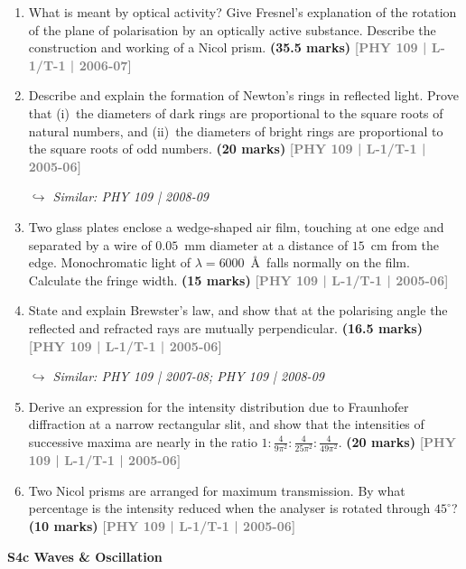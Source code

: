 \documentclass[12pt,a3paper]{article}
\newcommand{\yr}[1]{\hfill\textcolor{gray}{\small\textbf{[#1]}}}
\newcommand{\mk}[1]{\textcolor{orange!70!black}{\small\textbf{(#1 marks)}}}
\newcommand{\variant}[1]{\par\vspace{1pt}\textcolor{blue!50!black}%
  {\footnotesize\textit{$\hookrightarrow$ Similar: #1}}}
\newcommand{\subtopic}[2]{%
  \vspace{10pt}
  \noindent\begin{tcolorbox}[colback=#1!8,colframe=#1,boxrule=0.6pt,arc=4pt,
    left=6pt,right=6pt,top=4pt,bottom=4pt]
    \small\bfseries\textcolor{#1}{#2}
  \end{tcolorbox}
  \vspace{2pt}
}
\begin{document}
\begin{enumerate}
\item What is meant by optical activity? Give Fresnel's explanation of the rotation of the plane of polarisation by an optically active substance. Describe the construction and working of a Nicol prism.
\mk{35.5} \yr{PHY 109 | L-1/T-1 | 2006-07}

\item Describe and explain the formation of Newton's rings in reflected light. Prove that (i)~the diameters of dark rings are proportional to the square roots of natural numbers, and (ii)~the diameters of bright rings are proportional to the square roots of odd numbers.
\mk{20} \yr{PHY 109 | L-1/T-1 | 2005-06}
\variant{PHY 109 | 2008-09}

\item Two glass plates enclose a wedge-shaped air film, touching at one edge and separated by a wire of $0.05$~mm diameter at a distance of $15$~cm from the edge. Monochromatic light of $\lambda = 6000$~\AA\ falls normally on the film. Calculate the fringe width.
\mk{15} \yr{PHY 109 | L-1/T-1 | 2005-06}

\item State and explain Brewster's law, and show that at the polarising angle the reflected and refracted rays are mutually perpendicular.
\mk{16.5} \yr{PHY 109 | L-1/T-1 | 2005-06}
\variant{PHY 109 | 2007-08; PHY 109 | 2008-09}

\item Derive an expression for the intensity distribution due to Fraunhofer diffraction at a narrow rectangular slit, and show that the intensities of successive maxima are nearly in the ratio $1 : \frac{4}{9\pi^2} : \frac{4}{25\pi^2} : \frac{4}{49\pi^2}$.
\mk{20} \yr{PHY 109 | L-1/T-1 | 2005-06}

\item Two Nicol prisms are arranged for maximum transmission. By what percentage is the intensity reduced when the analyser is rotated through $45^\circ$?
\mk{10} \yr{PHY 109 | L-1/T-1 | 2005-06}

\end{enumerate}

\label{sec:s4c}
\subtopic{cA}{S4c \quad Waves \& Oscillation}
\end{document}

